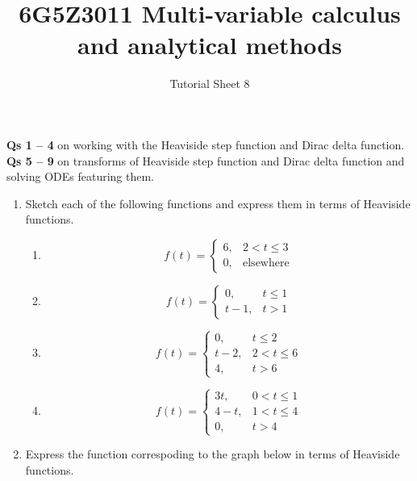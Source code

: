 \documentclass[a4paper]{amsart}
\begin{document}
\title{6G5Z3011 Multi-variable calculus and analytical methods}
\author{Tutorial Sheet 8}
\maketitle

\textbf{Qs 1 -- 4} on working with the Heaviside step function and Dirac delta function. \\
\textbf{Qs 5 -- 9} on transforms of Heaviside step function and Dirac delta function and solving ODEs featuring them.

\begin{enumerate}
    \item
Sketch each of the following functions and express them in terms of Heaviside functions.
\begin{enumerate}
    \item
    $$
       f(t) = \left\{
         \begin{array}{lr}
           6, &  2 < t \leq 3\\
           0, & \text{elsewhere} 
         \end{array}
       \right.
    $$
    \item
    $$
       f(t) = \left\{
         \begin{array}{lr}
           0, &  t \leq 1 \\
           t-1, & t > 1 
         \end{array}
       \right.
    $$
    \item
    $$
       f(t) = \left\{
         \begin{array}{lr}
           0, &  t \leq 2\\
           t-2, & 2 < t \leq 6 \\
           4, & t > 6 
         \end{array}
       \right.
    $$
    \item
    $$
       f(t) = \left\{
         \begin{array}{lr}
           3t, &  0 < t \leq 1\\
           4-t, & 1< t \leq 4 \\
           0, & t > 4 
         \end{array}
       \right.
    $$
    \end{enumerate}
    \item
    Express the function correspoding to the graph below in terms of Heaviside functions.
    \begin{center}

\end{center}
\end{enumerate}
\end{document}
